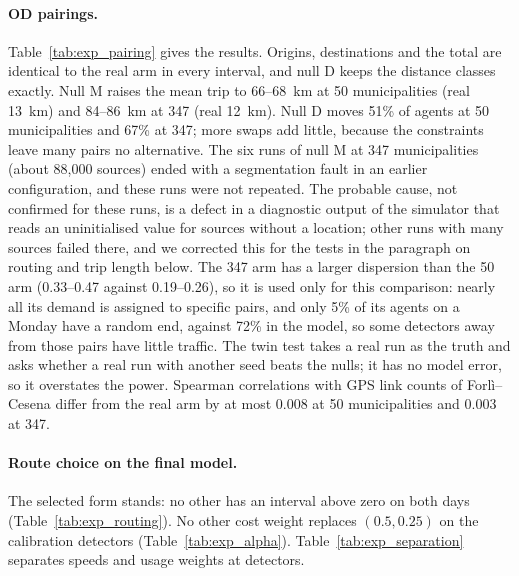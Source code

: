 \documentclass[11pt,a4paper]{article}
\begin{document}
\paragraph{OD pairings.} Table~\ref{tab:exp_pairing} gives the results. Origins, destinations and the total are identical to the real arm in every interval, and null D keeps the distance classes exactly. Null M raises the mean trip to 66--68~km at 50 municipalities (real 13~km) and 84--86~km at 347 (real 12~km). Null D moves 51\% of agents at 50 municipalities and 67\% at 347; more swaps add little, because the constraints leave many pairs no alternative. The six runs of null M at 347 municipalities (about 88,000 sources) ended with a segmentation fault in an earlier configuration, and these runs were not repeated. The probable cause, not confirmed for these runs, is a defect in a diagnostic output of the simulator that reads an uninitialised value for sources without a location; other runs with many sources failed there, and we corrected this for the tests in the paragraph on routing and trip length below. The 347 arm has a larger dispersion than the 50 arm (0.33--0.47 against 0.19--0.26), so it is used only for this comparison: nearly all its demand is assigned to specific pairs, and only 5\% of its agents on a Monday have a random end, against 72\% in the model, so some detectors away from those pairs have little traffic. The twin test takes a real run as the truth and asks whether a real run with another seed beats the nulls; it has no model error, so it overstates the power. Spearman correlations with GPS link counts of Forl\`i--Cesena differ from the real arm by at most 0.008 at 50 municipalities and 0.003 at 347.

\begin{table}[htbp]
\centering
\caption{OD pairings: real against null M and D, at 50 or 347 municipalities. Differences: real minus mean of three rearrangements; 95\% paired bootstrap over detectors (2,000 resamples, seed 20261061). Sens.: median $|\log_{10}|$(real/null) of daily volume at detectors. Twin: difference in dispersion with a real run as the truth.}
\label{tab:exp_pairing}
\resizebox{\textwidth}{!}{}
\end{table}

\paragraph{Route choice on the final model.} The selected form stands: no other has an interval above zero on both days (Table~\ref{tab:exp_routing}). No other cost weight replaces $(0.5,0.25)$ on the calibration detectors (Table~\ref{tab:exp_alpha}). Table~\ref{tab:exp_separation} separates speeds and usage weights at detectors.
\end{document}
